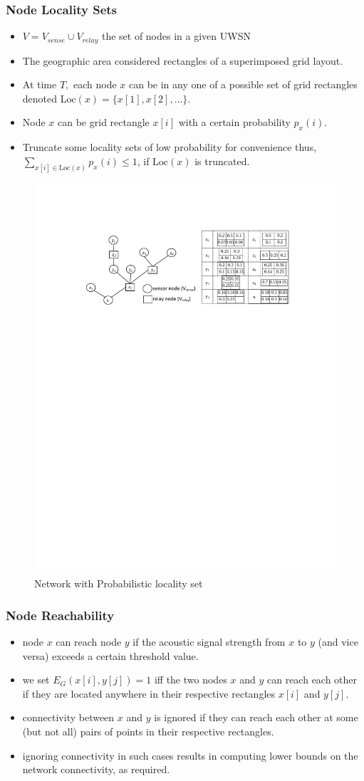 \documentclass{beamer}
\newcommand{\loc}   	{ {\mathrm {Loc}} }
\begin{document}
\begin{frame}
\frametitle{Node Locality Sets}
\begin{itemize}
\item  $V=V_{sense}\cup V_{relay}$ the set of nodes in a given UWSN
\item The geographic area considered rectangles of a superimposed grid layout.
%
\item At time $T,$ each node $x$ can be in any one of a possible
set of grid rectangles denoted $\loc(x)= \{ x[1], x[2], \ldots \}$.

\item Node $x$ can be grid rectangle $x[i]$ with a certain probability $p_x(i)$. 
\item Truncate some locality sets of low probability for convenience thus, $\sum_{x[i] \in \loc(x)} p_x(i) \leq 1$, if $\loc(x)$ is truncated.
\end{itemize}

\begin{figure}
\includegraphics[width=4 in, height=1 in]{LocalitySet.pdf}
\caption{Network with Probabilistic locality set}
\end{figure}
\end{frame}

\begin{frame}
\frametitle{Node Reachability}
\begin{itemize}
\item node $x$ can reach node $y$ if the acoustic signal strength from $x$ to $y$ (and vice versa) exceeds a certain threshold value.
\item we set $E_G(x[i],y[j])= 1$ iff the two nodes $x$ and $y$ can reach each other if they are located anywhere in their respective rectangles $x[i]$ and $y[j]$.

\item connectivity between $x$ and $y$ is ignored if 
they can reach each other at some (but not all) pairs of points in their respective rectangles.

\item ignoring connectivity in such cases results
in computing lower bounds on the network connectivity, as required.
\end{itemize}
\end{frame}
\end{document}
